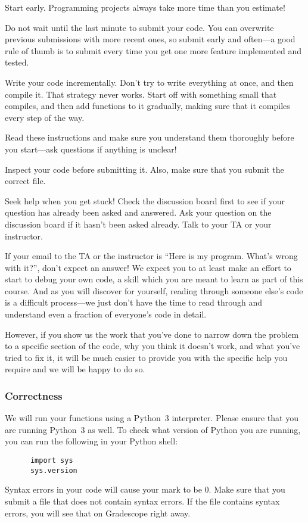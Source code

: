 \documentclass[11pt]{article}
\let\ezimeti\itemize
\let\ezimetidne\enditemize
\renewenvironment{itemize}
   {\ezimeti
    \setlength{\topsep}{.25ex plus .125ex minus .1825ex}%
    \setlength{\itemsep}{\topsep}\setlength{\parsep}{0ex}%
    \setlength{\leftmargin}{1.75em}\setlength{\labelsep}{.5em}%
    \setlength{\labelwidth}{1.75em}\ignorespaces}
   {\ezimetidne}
\newcommand*{\heading}[1]{\subsubsection*{#1}}
\begin{document}
\begin{itemize}
\item
    Start early.  Programming projects always take more time than you 
    estimate!
\item
    Do not wait until the last minute to submit your code.  You can 
    overwrite previous submissions with more recent ones, so submit early 
    and often---a good rule of thumb is to submit every time you get one 
    more feature implemented and tested.
\item
    Write your code incrementally.  Don't try to write everything at once, 
    and then compile it.  That strategy never works.  Start off with 
    something small that compiles, and then add functions to it gradually, 
    making sure that it compiles every step of the way.
\item
    Read these instructions and make sure you understand them thoroughly 
    before you start---ask questions if anything is unclear!
\item
    Inspect your code before submitting it.  Also, make sure that you 
    submit the correct file.
\item
    Seek help when you get stuck!  Check the discussion board first to see 
    if your question has already been asked and answered.  Ask your 
    question on the discussion board if it hasn't been asked already.  Talk 
    to your TA or your instructor.

\item
    If your email to the TA or the instructor is ``Here is my program.  
    What's wrong with it?'', don't expect an answer!  We expect you to at 
    least make an effort to start to debug your own code, a skill which you 
    are meant to learn as part of this course.  And as you will discover 
    for yourself, reading through someone else's code is a difficult 
    process---we just don't have the time to read through and understand 
    even a fraction of everyone's code in detail.

    However, if you show us the work that you've done to narrow down the 
    problem to a specific section of the code, why you think it doesn't 
    work, and what you've tried to fix it, it will be much easier to 
    provide you with the specific help you require and we will be happy to 
    do so.
\end{itemize}


\heading{Correctness}

We will run your functions using a Python~3 interpreter.  Please ensure that you are 
running Python~3 as well.  To check what version of Python you are 
running, you can run the following in your Python shell:
\begin{verbatim}
      import sys
      sys.version
\end{verbatim}
Syntax errors in your code will cause your mark to be 0. Make sure that you submit a file that does not contain syntax errors. If the file contains syntax errors, you will see that on Gradescope right away.
\end{document}
